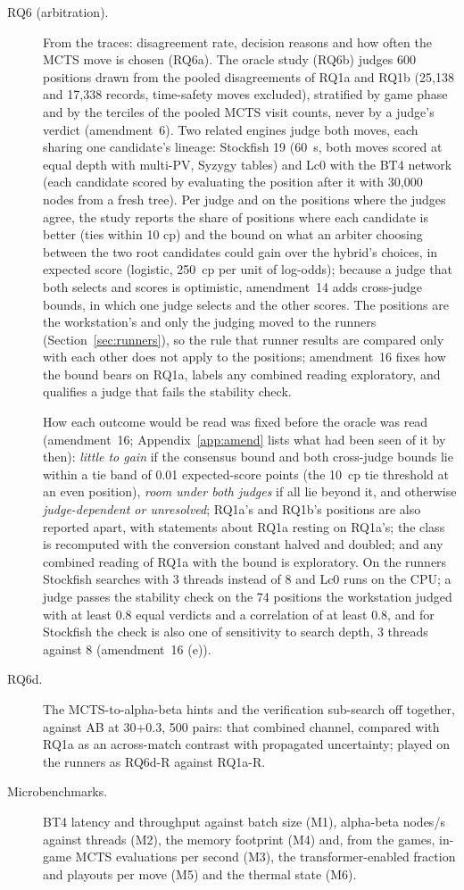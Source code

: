 \documentclass{article}
\begin{document}
\begin{description}
  \item[RQ6 (arbitration).] From the traces: disagreement rate, decision reasons and how often the MCTS move is chosen (RQ6a). The oracle study (RQ6b) judges 600 positions drawn from the pooled disagreements of RQ1a and RQ1b (25{,}138 and 17{,}338 records, time-safety moves excluded), stratified by game phase and by the terciles of the pooled MCTS visit counts, never by a judge's verdict (amendment~6). Two related engines judge both moves, each sharing one candidate's lineage: Stockfish 19 (60~s, both moves scored at equal depth with multi-PV, Syzygy tables) and Lc0 with the BT4 network (each candidate scored by evaluating the position after it with 30{,}000 nodes from a fresh tree). Per judge and on the positions where the judges agree, the study reports the share of positions where each candidate is better (ties within 10 cp) and the bound on what an arbiter choosing between the two root candidates could gain over the hybrid's choices, in expected score (logistic, 250~cp per unit of log-odds); because a judge that both selects and scores is optimistic, amendment~14 adds cross-judge bounds, in which one judge selects and the other scores. The positions are the workstation's and only the judging moved to the runners (Section~\ref{sec:runners}), so the rule that runner results are compared only with each other does not apply to the positions; amendment~16 fixes how the bound bears on RQ1a, labels any combined reading exploratory, and qualifies a judge that fails the stability check.
  \item[] How each outcome would be read was fixed before the oracle was read (amendment~16; Appendix~\ref{app:amend} lists what had been seen of it by then): \emph{little to gain} if the consensus bound and both cross-judge bounds lie within a tie band of 0.01 expected-score points (the 10~cp tie threshold at an even position), \emph{room under both judges} if all lie beyond it, and otherwise \emph{judge-dependent or unresolved}; RQ1a's and RQ1b's positions are also reported apart, with statements about RQ1a resting on RQ1a's; the class is recomputed with the conversion constant halved and doubled; and any combined reading of RQ1a with the bound is exploratory. On the runners Stockfish searches with 3 threads instead of 8 and Lc0 runs on the CPU; a judge passes the stability check on the 74 positions the workstation judged with at least 0.8 equal verdicts and a correlation of at least 0.8, and for Stockfish the check is also one of sensitivity to search depth, 3 threads against 8 (amendment~16 (e)).
  \item[RQ6d.] The MCTS-to-alpha-beta hints and the verification sub-search off together, against AB at 30+0.3, 500 pairs: that combined channel, compared with RQ1a as an across-match contrast with propagated uncertainty; played on the runners as RQ6d-R against RQ1a-R.
  \item[Microbenchmarks.] BT4 latency and throughput against batch size (M1), alpha-beta nodes/s against threads (M2), the memory footprint (M4) and, from the games, in-game MCTS evaluations per second (M3), the transformer-enabled fraction and playouts per move (M5) and the thermal state (M6).
\end{description}
\end{document}
